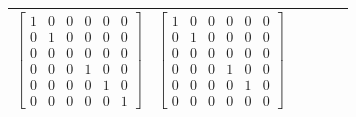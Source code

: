 \documentclass[preprint]{iucr}              %
\begin{document}
\begin{table}
\begin{tabular}{cccccc}
			$\begin{bmatrix} 1 & 0 & 0 & 0 & 0 & 0 \\ 0 & 1 & 0 & 0 & 0 & 0 \\ 0 & 0 & 0 & 0 & 0 & 0 \\ 0 & 0 & 0 & 1 & 0 & 0 \\ 0 & 0 & 0 & 0 & 1 & 0 \\ 0 & 0 & 0 & 0 & 0 & 1 \end{bmatrix}$ &
			$\begin{bmatrix} 1 & 0 & 0 & 0 & 0 & 0 \\ 0 & 1 & 0 & 0 & 0 & 0 \\ 0 & 0 & 0 & 0 & 0 & 0 \\ 0 & 0 & 0 & 1 & 0 & 0 \\ 0 & 0 & 0 & 0 & 1 & 0 \\ 0 & 0 & 0 & 0 & 0 & 0 \end{bmatrix}$ \\
			\bottomrule
		\end{tabular}
	\end{table}
	
\end{document}
